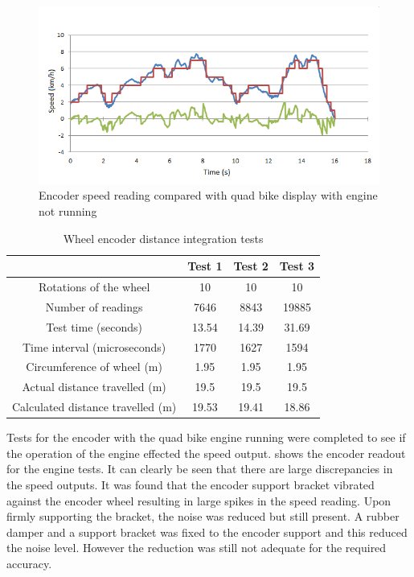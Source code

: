 \documentclass[main.tex]{subfiles}
\begin{document}
\begin{figure}[ht]
\includegraphics[width=1\textwidth]{5-Testing/encoder_data_20x_sampled.png}
\centering
\caption[Encoder speed reading compared with quad bike display]{Encoder speed reading compared with quad bike display with engine not running}
\end{figure}

\begin{table}[ht]
\centering
\caption[Wheel encoder distance integration tests]{Wheel encoder distance integration tests}
\begin{tabular}{cccc}
\toprule
                                   & Test 1 & Test 2 & Test 3 \\ \midrule
Rotations of the wheel            & 10     & 10     & 10     \\
Number of readings                & 7646   & 8843   & 19885  \\
Test time (seconds)               & 13.54  & 14.39  & 31.69  \\
Time interval (microseconds)      & 1770   & 1627   & 1594   \\
Circumference of wheel (m)        & 1.95   & 1.95   & 1.95   \\
Actual distance travelled (m)     & 19.5   & 19.5   & 19.5   \\
Calculated distance travelled (m) & 19.53  & 19.41  & 18.86  \\ \bottomrule
\end{tabular}
\end{table}

Tests for the encoder with the quad bike engine running were completed to see if the operation of the engine effected the speed output.  shows the encoder readout for the engine tests. It can clearly be seen that there are large discrepancies in the speed outputs. It was found that the encoder support bracket vibrated against the encoder wheel resulting in large spikes in the speed reading. Upon firmly supporting the bracket, the noise was reduced but still present. A rubber damper and a support bracket was fixed to the encoder support and this reduced the noise level. However the reduction was still not adequate for the required accuracy. 
\end{document}
